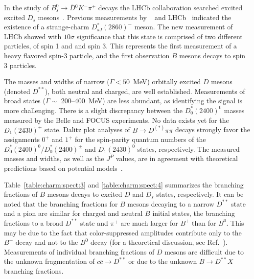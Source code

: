 In the study of $B_{s}^{0}\to \overline{D}{}^{0}K^{-}\pi^{+}$ decays the LHCb collaboration searched excited excited  $D_{s}$ mesons~\cite{Aaij:2014xza}.  Previous measurements by \babar{}~\cite{Aubert:2009ah} and LHCb~\cite{Aaij:2012pc} indicated the existence of a strange-charm $D^{*}_{sJ}(2860)^{-}$ meson. The new measurement of LHCb showed with $10\sigma$ significance that this state is comprised of two different particles,  of spin 1 and and spin 3. This represents the first measurement of a heavy flavored spin-3 particle, and the first observation $B$ mesons decays to spin 3 particles.

The masses and widths of narrow ($\Gamma<50$~MeV) orbitally excited $D$ mesons (denoted $D^{\ast\ast}$), both neutral and charged, are well established. Measurements of broad states ($\Gamma\sim$ 200--400~MeV) are less abundant, as identifying the signal is more challenging. There is a slight discrepancy between the 
$D_0^\ast(2400)^0$ masses measured by the Belle\citep{Abe:2003zm} and  FOCUS\citep{Link:2003bd} experiments. No data exists yet for the $D_1(2430)^{\pm}$ state. Dalitz plot analyses of $B\to D^{(\ast)}\pi\pi$ decays strongly favor the assignments $0^+$ and $1^+$ for the spin-parity quantum numbers of the $D_0^\ast(2400)^0/D_0^\ast(2400)^\pm$ and $D_1(2430)^{0}$ states, respectively. The measured masses and widths, as well as the $J^P$ values, are in agreement with theoretical predictions based on potential models~\cite{PhysRevD.32.189, PhysRevLett.16.109, PhysRevD.43.1679, PhysRevLett.66.1130, PhysRevD.66.114004}. 


Table~\ref{table:charm:spect:3} and \ref{table:charm:spect:4} summarizes the branching fractions of $B$ mesons decays to excited $D$ and $D_{s}$ states, respectively. It can be noted that the branching fractions for $B$ mesons decaying to a narrow $D^{\ast\ast}$ state and a pion are similar for charged and neutral $B$ initial states, the branching fractions to a broad $D^{\ast\ast}$ state and $\pi^+$ are much larger for $B^+$ than for $B^0$. This may be due to the fact that color-suppressed amplitudes contribute only to the $B^+$ decay and not to the $B^0$ decay (for a theoretical discussion, see Ref.~\citep{PhysRevD.72.094010,Colangelo:2004vu}). Measurements of individual branching fractions of $D$ mesons are difficult due to the unknown fragmentation of $c\bar c \to D^{\ast\ast}$ or due to the unknown $B \to D^{\ast\ast} X$ branching fractions.

